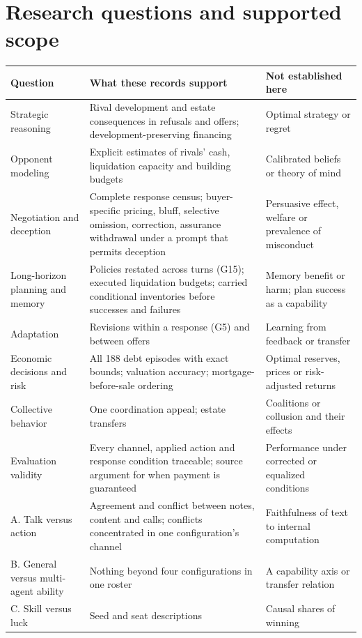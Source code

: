 \section{Research questions and supported scope}
\label{app:questions}
\begin{longtable}{@{}L{3.2cm}L{6.9cm}L{6.1cm}@{}}
\toprule Question & What these records support & Not established here\\\midrule\endhead
Strategic reasoning & Rival development and estate consequences in refusals and offers; development-preserving financing & Optimal strategy or regret\\
Opponent modeling & Explicit estimates of rivals' cash, liquidation capacity and building budgets & Calibrated beliefs or theory of mind\\
Negotiation and deception & Complete response census; buyer-specific pricing, bluff, selective omission, correction, assurance withdrawal under a prompt that permits deception & Persuasive effect, welfare or prevalence of misconduct\\
Long-horizon planning and memory & Policies restated across turns (G15); executed liquidation budgets; carried conditional inventories before successes and failures & Memory benefit or harm; plan success as a capability\\
Adaptation & Revisions within a response (G5) and between offers & Learning from feedback or transfer\\
Economic decisions and risk & All 188 debt episodes with exact bounds; valuation accuracy; mortgage-before-sale ordering & Optimal reserves, prices or risk-adjusted returns\\
Collective behavior & One coordination appeal; estate transfers & Coalitions or collusion and their effects\\
Evaluation validity & Every channel, applied action and response condition traceable; source argument for when payment is guaranteed & Performance under corrected or equalized conditions\\\midrule
A. Talk versus action & Agreement and conflict between notes, content and calls; conflicts concentrated in one configuration's channel & Faithfulness of text to internal computation\\
B. General versus multi-agent ability & Nothing beyond four configurations in one roster & A capability axis or transfer relation\\
C. Skill versus luck & Seed and seat descriptions & Causal shares of winning\\\bottomrule
\end{longtable}

